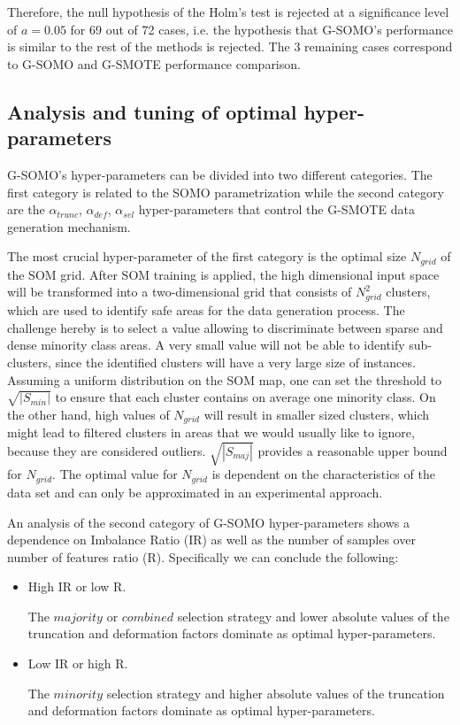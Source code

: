 \documentclass[parskip=full]{scrartcl}
\begin{document}
Therefore, the null hypothesis of the Holm's test is rejected at a significance
level of $a = 0.05$ for 69 out of 72 cases, i.e. the hypothesis that G-SOMO's performance is similar to the rest of the methods is rejected. The 3 remaining cases correspond to G-SOMO and G-SMOTE performance comparison.

\subsection{Analysis and tuning of optimal hyper-parameters}

G-SOMO's hyper-parameters can be divided into two different categories. The first category is related to the SOMO parametrization while the second category are the $\alpha_{trunc}$, $\alpha_{def}$, $\alpha_{sel}$ hyper-parameters that control the G-SMOTE data generation mechanism.

The most crucial hyper-parameter of the first category is the optimal size $N_{grid}$ of the SOM grid. After SOM training is applied, the high dimensional input space will be transformed into a two-dimensional grid that consists of $N_{grid}^2$ clusters, which are used to identify safe areas for the data generation process. The challenge hereby is to select a value allowing to discriminate between sparse and dense minority class areas.  A very small value will not be able to identify sub-clusters, since the identified clusters will have a very large size of instances. Assuming a uniform distribution on the SOM map, one can set the threshold to $\sqrt{|S_{min}|}$ to ensure that each cluster contains on average one minority class. On the other hand, high values of $N_{grid}$ will result in smaller sized clusters, which might lead to filtered clusters in areas that we would usually like to ignore, because they are considered outliers. $\sqrt{|S_{maj}|}$ provides a reasonable upper bound for $N_{grid}$. The optimal value for $N_{grid}$ is dependent on the characteristics of the data set and can only be approximated in an experimental approach.

An analysis of the second category of G-SOMO hyper-parameters shows a dependence on Imbalance Ratio (IR) as well as the number of samples over number of features ratio (R). Specifically we can conclude the following:

\begin{itemize}

	\renewcommand\labelitemi{--}

	\item High IR or low R.
	
	The $ majority $ or $ combined $ selection strategy and lower absolute values of the truncation and deformation factors dominate as optimal hyper-parameters.

	\item Low IR or high R.
	
	The $ minority $ selection strategy and higher absolute values of the truncation and deformation factors dominate as optimal hyper-parameters.

\end{itemize}
\end{document}
